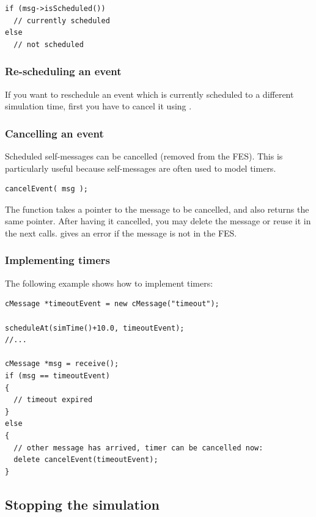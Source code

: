 \begin{verbatim}
if (msg->isScheduled())
  // currently scheduled
else
  // not scheduled
\end{verbatim}


\subsubsection{Re-scheduling an event}

If you want to reschedule an event which is currently scheduled to a different
simulation time, first you have to cancel it using .


\subsubsection{Cancelling an event}

Scheduled self-messages can be cancelled
 (removed from the FES).
This is particularly useful because self-messages are often used
to model timers.

\begin{verbatim}
cancelEvent( msg );
\end{verbatim}

The  function takes a pointer to the message to
be cancelled, and also returns the same pointer. After having it
cancelled, you may delete the message or reuse it in the next
 calls.  gives an error if
the message is not in the FES.


\subsubsection{Implementing timers}

The following example shows how to implement timers:

\begin{verbatim}
cMessage *timeoutEvent = new cMessage("timeout");

scheduleAt(simTime()+10.0, timeoutEvent);
//...

cMessage *msg = receive();
if (msg == timeoutEvent)
{
  // timeout expired
}
else
{
  // other message has arrived, timer can be cancelled now:
  delete cancelEvent(timeoutEvent);
}
\end{verbatim}





\subsection{Stopping the simulation}

